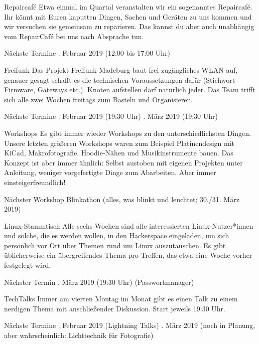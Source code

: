 \documentclass[flyer]{netz39} %
\begin{document}
\begin{entry}{Repaircafé}
Etwa einmal im Quartal veranstalten wir ein sogenanntes Repaircafé. Ihr könnt mit Euren kaputten Dingen, Sachen und Geräten zu uns kommen und wir versuchen sie gemeinsam zu reparieren.  Das kannst du aber auch unabhängig vom RepairCafé bei uns nach Absprache tun.
\begin{events}{Nächste Termine}
	. Februar 2019 (12:00 bis 17:00 Uhr)
\end{events}
\end{entry}

\begin{entry}{Freifunk}
Das Projekt Freifunk Madeburg baut frei zugängliches WLAN auf, genauer gesagt schafft es die technischen Voraussetzungen dafür (Stichwort Firmware, Gateways etc.). Knoten aufstellen darf natürlich jeder. Das Team trifft sich alle zwei Wochen freitags zum Basteln und Organisieren.
\begin{events}{Nächste Termine}
	. Februar 2019 (19:30 Uhr)
	. März 2019 (19:30 Uhr)
\end{events}
\end{entry}


\begin{entry}{Workshops}
Es gibt immer wieder Workshops zu den unterschiedlichsten Dingen. Unsere letzten größeren Workshops waren zum Beispiel Platinendesign mit KiCad, Makrofotografie, Hoodie-Nähen und Musikinstrumente bauen. Das Konzept ist aber immer ähnlich: Selbst austoben mit eigenen Projekten unter Anleitung, weniger vorgefertigte Dinge zum Abarbeiten. Aber immer einsteigerfreundlich!
\begin{events}{Nächster Workshop}
	\event Blinkathon (alles, was blinkt und leuchtet; 30./31. März 2019)
\end{events}
\end{entry}

\begin{entry}{Linux-Stammtisch}
Alle sechs Wochen sind alle interessierten Linux-Nutzer*innen und solche, die es werden wollen, in den Hackerspace eingeladen, um sich persönlich vor Ort über Themen rund um Linux auszutauschen. Es gibt üblicherweise ein übergreifendes Thema pro Treffen, das etwa eine Woche vorher festgelegt wird. 
\begin{events}{Nächster Termin}
	. März 2019 (19:30 Uhr) (Passwortmanager)
\end{events}
\end{entry}

\begin{entry}{TechTalks}
Immer am vierten Montag im Monat gibt es einen Talk zu einem nerdigen Thema mit anschließender Diskussion. Start jeweils 19:30 Uhr.
\begin{events}{Nächste Termine}
	. Februar 2019 (Lightning Talks)
	. März 2019 (noch in Planung, aber wahrscheinlich: Lichttechnik für Fotografie)
\end{events}
\end{entry}
\end{document}
